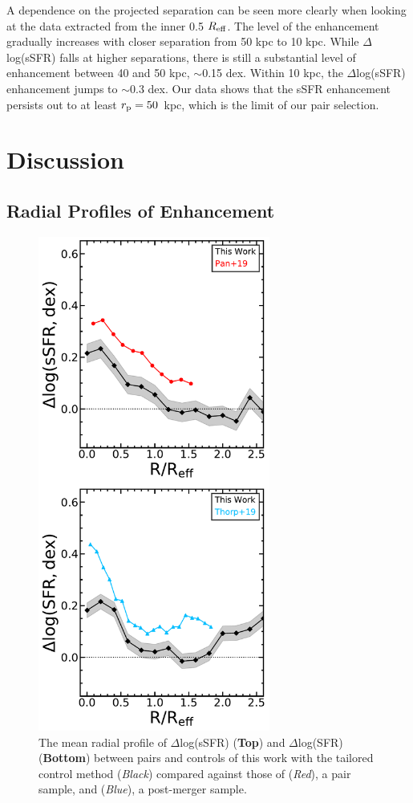 \documentclass[iop,revtex4,twocolumn,apj,numberedappendix,appendixfloats]{emulateapj}
\newcommand{\reff}{$R_{\rm eff}$}
\begin{document}
A dependence on the projected separation can be seen more clearly when looking at the data extracted from the inner 0.5 \reff. The level of the enhancement gradually increases with closer separation from 50 kpc to 10 kpc. While $\Delta$log(sSFR) falls at higher separations, there is still a substantial level of enhancement between 40 and 50 kpc, $\sim$0.15 dex. Within 10 kpc, the $\Delta$log(sSFR) enhancement jumps to $\sim$0.3 dex. Our data shows that the sSFR enhancement persists out to at least $r_{\rm p} = 50$~kpc, which is the limit of our pair selection. 



\section{Discussion}\label{sec:disc}

\subsection{Radial Profiles of Enhancement}

\begin{figure}
\centering
\includegraphics[width=3in]{fig/prof_comp.pdf}
\caption[]{The mean radial profile of $\Delta$log(sSFR) (\textbf{Top}) and $\Delta$log(SFR) (\textbf{Bottom}) between pairs and controls of this work with the tailored control method ({\it Black}) compared against those of \citet{Pan:2019} ({\it Red}), a pair sample, and \citet{Thorp:2019} ({\it Blue}), a post-merger sample.}
\label{fig:prof_comp}
\end{figure}
\end{document}
